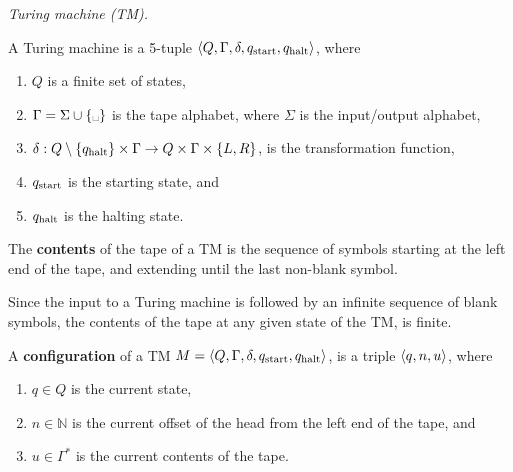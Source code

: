 \begin{definition} \emph{Turing machine (TM).}

A Turing machine is a 5-tuple $\mathopen{}\left\langle{Q,\Gamma,\delta,\ensuremath{q_{\text{start}}},\ensuremath{q_{\text{halt}}}}\right\rangle\mathclose{}$, where

\begin{enumerate}

\item $Q$ is a finite set of states,

\item $\Gamma=\Sigma\cup\set{\text{\textvisiblespace}}$ is the tape alphabet,
where $\Sigma$ is the input/output alphabet,

\item $\delta:Q\setminus\mathopen{}\left\{{q_{\text{halt}}}\right\}\mathclose{}\times\Gamma \rightarrow
Q\times\Gamma\times\mathopen{}\left\{{L,R}\right\}\mathclose{}$, is the transformation function,

\item $q_{\text{start}}$ is the starting state, and

\item $q_{\text{halt}}$ is the halting state.

\end{enumerate}

\end{definition}

\begin{definition}

The \textbf{contents} of the tape of a TM is the sequence of symbols starting
at the left end of the tape, and extending until the last non-blank symbol.

\end{definition}

Since the input to a Turing machine is followed by an infinite sequence of
blank symbols, the contents of the tape at any given state of the TM, is
finite.

\begin{definition}

A \textbf{configuration} of a TM $M=\mathopen{}\left\langle{Q,\Gamma,\delta,\ensuremath{q_{\text{start}}},\ensuremath{q_{\text{halt}}}}\right\rangle\mathclose{}$, is
a triple $\mathopen{}\left\langle{q,n,u}\right\rangle\mathclose{}$, where

\begin{enumerate}

\item $q\in Q$ is the current state,

\item $n\in \mathbb{N}$ is the current offset of the head from the left end of
the tape, and

\item $u\in \Gamma^*$ is the current contents of the tape.

\end{enumerate}

\end{definition}


